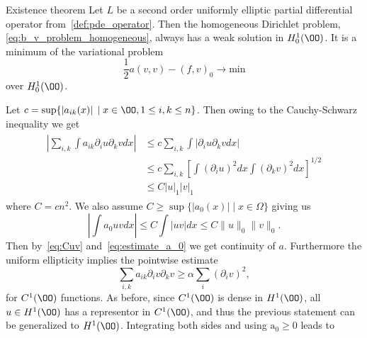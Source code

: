 \begin{thmx}{Existence theorem}
    Let $L$ be a second order uniformly elliptic partial differential operator from~\eqref{def:pde_operator}. %
     Then the homogeneous Dirichlet problem,
     \eqref{eq:b_v_problem_homogeneous}, always has a weak solution in $H_0^1(\OO)$. It is a minimum of the variational problem
    \begin{equation}
        \frac{1}{2} a(v,v) - {(f, v)}_0 \rightarrow \text{min}
    \end{equation}
    over $H_0^1(\OO)$.\label{thm:existence_hom_dirichlet}
\end{thmx}

\begin{bev}
    Let $c = \sup\{\left| a_{ik}(x) \right| \; | \; x \in \OO, 1 \leq i,k \leq n\}$. Then owing to the Cauchy-Schwarz inequality we get
    \begin{align}
    \begin{split}
        \left| \sum_{i,k} \int a_{ik} \partial_i u \partial_k v dx \right| &\leq c \sum_{i,k} \int  \left|  \partial_i u \partial_k v dx\right|\\
        &\leq c \sum_{i,k} {\left[ \int {\left( \partial_i u \right)}^2 dx \int {\left( \partial_k v \right)}^2 dx  \right]}^{1/2} \\
        &\leq C {\left| u \right|}_1 {\left| v \right|}_1 \label{eq:Cuv}
    \end{split}
    \end{align}
    where $C=cn^2$. 
    We also assume $C\geq \sup\{|a_0(x)| \; | \; x\in \Omega\}$ giving us
    \begin{equation}
        \left|\int a_0 u v dx \right| \leq C \int |u v| dx \leq C \|u\|_0 \|v\|_0.  
        \label{eq:estimate_a_0}   
    \end{equation}
    Then by~\eqref{eq:Cuv} and~\eqref{eq:estimate_a_0} we get continuity of $a$.
    Furthermore the uniform ellipticity implies the pointwise estimate %
    \[
        \sum_{i,k} a_{ik} \partial_i v \partial_k v \geq \alpha \sum_i {\left( \partial_i v \right)}^2,
    \]
    for $C^1(\OO)$ functions.
    As before, since $C^1(\OO)$ is dense in $H^1(\OO)$, all $u \in H^1(\OO)$ has a  %
    representor in $C^1(\OO)$, and thus the previous statement can be generalized to $H^1(\OO)$.
    Integrating both sides and using $\text{a}_0 \geq 0$ leads to %

\end{bev}
